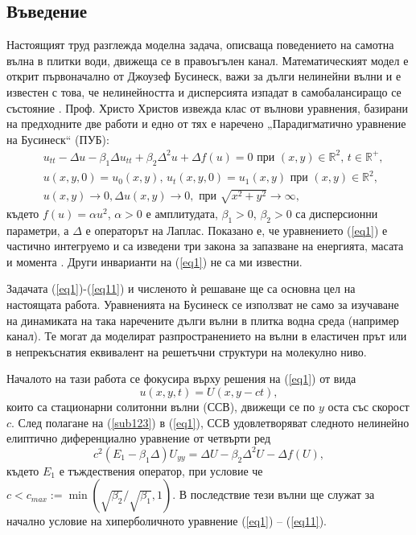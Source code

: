 \documentclass[a5paper]{article}
\newcommand{\be}{\begin{equation}}
\newcommand{\ee}{\end{equation}}
\newcommand{\rf}[1]{(\ref{#1})}
\newcommand{\RR}{\mathbb{R}}
\theoremstyle{remark}
\begin{document}
\begin{large}
\section{Въведение}\label{introduction}
Настоящият труд разглежда моделна задача, описваща поведението на самотна вълна в плитки води, движеща се в правоъгълен канал. Математическият модел е открит първоначално от Джоузеф Бусинеск, важи за дълги нелинейни вълни и е известен с това, че нелинейността и дисперсията изпадат в самобалансиращо се състояние \cite{ref01,ref02}. Проф. Христо Христов \cite{ref1} извежда клас от вълнови уравнения, базирани на предходните две работи и едно от тях е наречено „Парадигматично уравнение на Бусинеск“ (ПУБ):
\begin{align}
&u_{tt} - \Delta u -\beta_1  \Delta u_{tt} +\beta_2 \Delta ^2 u + \Delta f(u)=0 \text{ при } (x,y) \in \RR^2, \, t\in\RR^+,\label{eq1}
\\ \nonumber &u(x,y,0)=u_0(x,y), \, u_t(x,y,0)=u_1(x,y) \text{ при } (x,y) \in \RR^2,
\\  &u(x,y) \rightarrow 0,  \Delta u(x,y) \rightarrow 0 ,  \text{ при }  \sqrt{x^2 + y^2} \rightarrow \infty, \label{eq11}
\end{align}
където $f(u)=\alpha u^2$, $\alpha>0$ е амплитудата, $\beta_1>0$, $\beta_2>0$ са дисперсионни параметри, а $\Delta$ е операторът на Лаплас. Показано е, че уравнението \rf{eq1} е частично интегруемо и са изведени три закона за запазване на енергията, масата и момента \cite{ref1, ref159}. Други инварианти на \rf{eq1} не са ми известни. 

Задачата \rf{eq1}-\rf{eq11} и численото ѝ решаване ще са основна цел на настоящата работа. Уравненията на Бусинеск се използват не само за изучаване на динамиката на така наречените дълги вълни в плитка водна среда (например канал). Те могат да моделират разпространението на вълни в еластичен прът или в непрекъснатия еквивалент на решетъчни структури на молекулно ниво.

Началото на тази работа се фокусира върху решения на \rf{eq1} от вида 
\be\label{sub123}
u(x,y,t)=U(x,y-ct),
\ee
които са стационарни солитонни вълни (ССВ), движещи се по $y$ оста със скорост $c$. След полагане на \rf{sub123} в \rf{eq1}, ССВ удовлетворяват следното нелинейно елиптично диференциално уравнение от четвърти ред
\begin{equation}\label{eq2}
c^2 (E_1-\beta_1 \Delta) U_{yy} = \Delta U -\beta_2 \Delta^2 U - \Delta f(U),
\end{equation}
където $E_1$ е тъждествения оператор, при условие че $c < c_{max}:=\min (\sqrt{\beta_2}/ \sqrt{\beta_1},1)$. В последствие тези вълни ще служат за начално условие на хиперболичното уравнение \rf{eq1} -- \rf{eq11}. 


\end{large}
\end{document}
